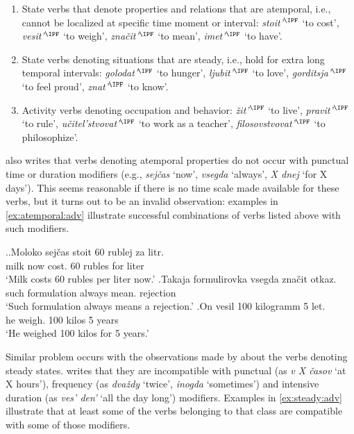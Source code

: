 \begin{enumerate}
\item State verbs that denote properties and relations that are atemporal, i.e., cannot be localized at specific time moment or interval: \textit{stoit'}$^{\IPF}$ `to cost', \textit{vesit'}$^{\IPF}$ `to weigh', \textit{zna\v{c}it'}$^{\IPF}$ `to mean', \textit{imet'}$^{\IPF}$ `to have'.
\item State verbs denoting situations that are steady,  i.e., hold for extra long temporal intervals: \textit{golodat'}$^{\IPF}$ `to hunger', \textit{ljubit'}$^{\IPF}$ `to love', \textit{gorditsja'}$^{\IPF}$ `to feel proud', \textit{znat'}$^{\IPF}$ `to know'.
\item Activity verbs denoting occupation and behavior: \textit{\v{z}it'}$^{\IPF}$ `to live', \textit{pravit'}$^{\IPF}$ `to rule', \textit{u\v{c}itel'stvovat'}$^{\IPF}$ `to work as a teacher', \textit{filosovstvovat'}$^{\IPF}$ `to philosophize'.
\end{enumerate}

\citet{Paducheva:96} also writes that verbs denoting atemporal properties do not occur with punctual time or duration modifiers (e.g., \textit{sej\v{c}as} `now', \textit{vsegda} `always', \textit{X dnej} `for X days'). This seems reasonable if there is no time scale made available for these verbs, but it turns out to be an invalid observation: examples in \ref{ex:atemporal:adv} illustrate successful combinations of verbs listed above with such modifiers.


\ex.\label{ex:atemporal:adv}\ag.Moloko sej\v{c}as stoit 60 rublej za litr.\\
milk now cost. 60 rubles for liter\\
\trans `Milk costs 60 rubles per liter now.'
\bg.Takaja formulirovka vsegda zna\v{c}it otkaz.\\
such formulation always mean. rejection\\
\trans `Such formulation always means a rejection.'
\bg.On vesil 100 kilogramm 5 let.\\
he weigh. 100 kilos 5 years\\
\trans `He weighed 100 kilos for 5 years.'

Similar problem occurs with the observations made by \citet{Paducheva:96} about the verbs denoting steady states. \citet{Paducheva:96} writes that they are incompatible with punctual (as \textit{v X \v{c}asov} `at X hours'), frequency (as \textit{dva\v{z}dy} `twice', \textit{inogda} `sometimes') and intensive duration  (as \textit{ves' den'} `all the day long') modifiers. Examples in \ref{ex:steady:adv} illustrate that at least some of the verbs belonging to that class are compatible with some of those modifiers.

